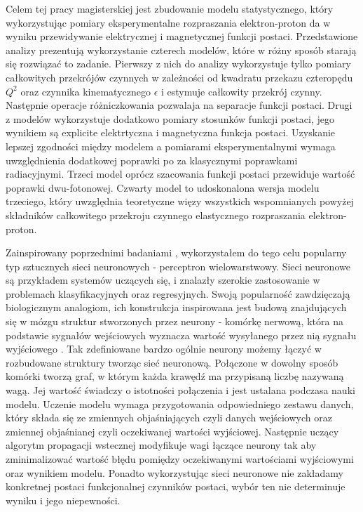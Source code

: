 \documentclass[11pt]{book}
\theoremstyle{definition}
\begin{document}
Celem tej pracy magisterskiej jest zbudowanie modelu statystycznego, który wykorzystując pomiary eksperymentalne rozpraszania elektron-proton da w wyniku przewidywanie elektrycznej i magnetycznej funkcji postaci. Przedstawione analizy prezentują wykorzystanie czterech modelów, które w różny sposób starają się rozwiązać to zadanie. Pierwszy z nich do analizy wykorzystuje tylko pomiary całkowitych przekrójów czynnych w zależności od kwadratu przekazu czteropędu $Q^2$ oraz czynnika kinematycznego $\epsilon$ i estymuje całkowity przekrój czynny. Następnie operacje różniczkowania pozwalaja na separacje funkcji postaci. Drugi z modelów wykorzystuje dodatkowo pomiary stosunków funkcji postaci, jego wynikiem są explicite elektrtyczna i magnetyczna funkcja postaci. Uzyskanie lepszej zgodności między modelem a pomiarami eksperymentalnymi wymaga uwzględnienia dodatkowej poprawki po za klasycznymi poprawkami radiacyjnymi. Trzeci model oprócz szacowania funkcji postaci przewiduje wartość poprawki dwu-fotonowej. Czwarty model to udoskonalona wersja modelu trzeciego, który uwzględnia teoretyczne więzy wszystkich wspomnianych powyżej składników całkowitego przekroju czynnego elastycznego rozpraszania elektron-proton.

Zainspirowany poprzednimi badaniami \cite{2009PhRvC..79f5204A}, \cite{PhysRevC.84.034314} wykorzystałem do tego celu popularny typ sztucznych sieci neuronowych - perceptron wielowarstwowy. Sieci neuronowe są przykładem systemów uczących się, i znalazły szerokie zastosowanie w problemach klasyfikacyjnych oraz regresyjnych. Swoją popularność zawdzięczają biologicznym analogiom, ich konstrukcja inspirowana jest budową znajdujących się w mózgu struktur stworzonych przez neurony - komórkę nerwową, która na podstawie sygnałów wejściowych wyznacza wartość wysyłanego przez nią sygnału wyjściowego \cite{1957Rosenblatt}. Tak zdefiniowane bardzo ogólnie neurony możemy łączyć w rozbudowane struktury tworząc sieć neuronową. Połączone w dowolny sposób komórki tworzą graf, w którym każda krawędź ma przypisaną liczbę nazywaną wagą. Jej wartość świadczy o istotności połączenia i jest ustalana podczasa nauki modelu. Uczenie modelu wymaga przygotowania odpowiedniego zestawu danych, który składa się ze zmiennych objaśniających czyli danych wejściowych oraz zmiennej objaśnianej czyli oczekiwanej wartości wyjściowej. Następnie uczący algorytm propagacji wstecznej modyfikuje wagi łączące neurony tak aby zminimalizować wartość błędu pomiędzy oczekiwanymi wartościami wyjściowymi oraz wynikiem modelu. Ponadto wykorzystując sieci neuronowe nie zakładamy konkretnej postaci funkcjonalnej czynników postaci, wybór ten nie determinuje wyniku i jego niepewności.
\end{document}
